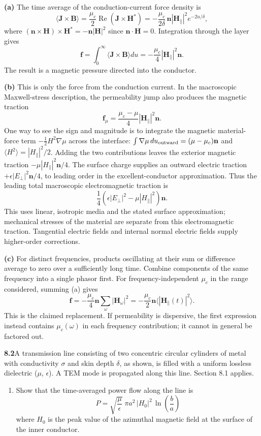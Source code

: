 \textbf{(a)} The time average of the conduction-current force density is
\[
\langle\mathbf J\times\mathbf B\rangle
=\frac{\mu_c}2\operatorname{Re}(\mathbf J\times\mathbf H^*)
=-\frac{\mu_c}{2\delta}\,\mathbf n
|\mathbf H_\parallel|^2e^{-2u/\delta},
\]
where $(\mathbf n\times\mathbf H)\times\mathbf H^*
=-\mathbf n|\mathbf H|^2$ since $\mathbf n\cdot\mathbf H=0$.
Integration through the layer gives
\[
\boxed{\mathbf f=\int_0^\infty\langle\mathbf J\times\mathbf B\rangle du
=-\frac{\mu_c}{4}|\mathbf H_\parallel|^2\mathbf n.}
\]
The result is a magnetic pressure directed into the conductor.

\textbf{(b)} This is only the force from the conduction current.
In the macroscopic Maxwell-stress description, the permeability
jump also produces the magnetic traction
\[
\mathbf f_{\mu}=\frac{\mu_c-\mu}{4}|\mathbf H_\parallel|^2\mathbf n.
\]
One way to see the sign and magnitude is to integrate the magnetic
material-force term $-\tfrac12H^2\nabla\mu$ across the interface:
$\int\nabla\mu\,du_{\rm outward}=(\mu-\mu_c)\mathbf n$ and
$\langle H^2\rangle=|H_\parallel|^2/2$.
Adding the two contributions leaves the exterior magnetic traction
$-\mu|H_\parallel|^2\mathbf n/4$.
The surface charge supplies an outward electric traction
$+\epsilon|E_\perp|^2\mathbf n/4$, to leading order in the
excellent-conductor approximation.  Thus the leading total
macroscopic electromagnetic traction is
\[
\frac14\left(\epsilon|E_\perp|^2-\mu|H_\parallel|^2\right)\mathbf n.
\]
This uses linear, isotropic media and the stated surface approximation;
mechanical stresses of the material are separate from this
 electromagnetic traction.  Tangential electric fields and internal
normal electric fields supply higher-order corrections.

\textbf{(c)} For distinct frequencies, products oscillating at their
sum or difference average to zero over a sufficiently long time.
Combine components of the same frequency into a single phasor first.
For frequency-independent $\mu_c$ in the range considered, summing
(a) gives
\[
\mathbf f=-\frac{\mu_c}{4}\mathbf n\sum_\omega|\mathbf H_\omega|^2
=-\frac{\mu_c}{2}\mathbf n\langle|\mathbf H_\parallel(t)|^2\rangle.
\]
This is the claimed replacement.  If permeability is dispersive,
the first expression instead contains $\mu_c(\omega)$ in each
frequency contribution; it cannot in general be factored out.

\par\bigskip
\noindent\textbf{8.2}\quad A transmission line consisting of two concentric circular cylinders of metal with conductivity $\sigma$ and skin depth $\delta$, as shown, is filled with a uniform lossless dielectric ($\mu$, $\epsilon$). A TEM mode is propagated along this line. Section 8.1 applies.
\begin{enumerate}
\item[(a)] Show that the time-averaged power flow along the line is
\[
P=\sqrt{\frac{\mu}{\epsilon}}\;\pi a^{2}\,|H_{0}|^{2}\,\ln\!\left(\frac{b}{a}\right)
\]
where $H_{0}$ is the peak value of the azimuthal magnetic field at the surface of the inner conductor.
\end{enumerate}

